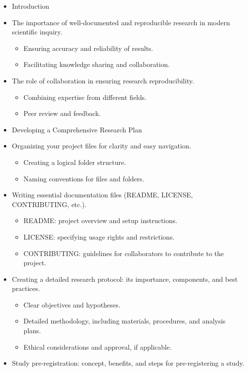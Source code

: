 \documentclass[
  letterpaper,
  DIV=11,
  numbers=noendperiod]{scrreprt}
\providecommand{\tightlist}{%
  \setlength{\itemsep}{0pt}\setlength{\parskip}{0pt}}\usepackage{longtable,booktabs,array}
\theoremstyle{definition}
\theoremstyle{remark}
\begin{document}
\begin{itemize}
\tightlist
\item
  Introduction
\item
  The importance of well-documented and reproducible research in modern
  scientific inquiry.

  \begin{itemize}
  \tightlist
  \item
    Ensuring accuracy and reliability of results.
  \item
    Facilitating knowledge sharing and collaboration.
  \end{itemize}
\item
  The role of collaboration in ensuring research reproducibility.

  \begin{itemize}
  \tightlist
  \item
    Combining expertise from different fields.
  \item
    Peer review and feedback.
  \end{itemize}
\item
  Developing a Comprehensive Research Plan
\item
  Organizing your project files for clarity and easy navigation.

  \begin{itemize}
  \tightlist
  \item
    Creating a logical folder structure.
  \item
    Naming conventions for files and folders.
  \end{itemize}
\item
  Writing essential documentation files (README, LICENSE, CONTRIBUTING,
  etc.).

  \begin{itemize}
  \tightlist
  \item
    README: project overview and setup instructions.
  \item
    LICENSE: specifying usage rights and restrictions.
  \item
    CONTRIBUTING: guidelines for collaborators to contribute to the
    project.
  \end{itemize}
\item
  Creating a detailed research protocol: its importance, components, and
  best practices.

  \begin{itemize}
  \tightlist
  \item
    Clear objectives and hypotheses.
  \item
    Detailed methodology, including materials, procedures, and analysis
    plans.
  \item
    Ethical considerations and approval, if applicable.
  \end{itemize}
\item
  Study pre-registration: concept, benefits, and steps for
  pre-registering a study.


\end{itemize}
\end{document}

